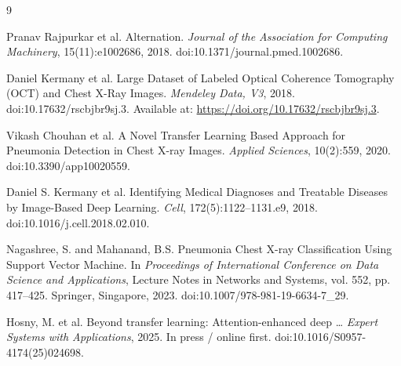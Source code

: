 \documentclass[11pt]{article}
\begin{document}
\pagebreak
\begin{thebibliography}{9}  %

Pranav Rajpurkar et al.
\newblock Alternation.
\newblock \emph{Journal of the Association for Computing Machinery}, 15(11):e1002686, 2018.
\newblock doi:10.1371/journal.pmed.1002686.

Daniel Kermany et al.
\newblock Large Dataset of Labeled Optical Coherence Tomography (OCT) and Chest X-Ray Images.
\newblock \emph{Mendeley Data, V3}, 2018.
\newblock doi:10.17632/rscbjbr9sj.3.
\newblock Available at: \url{https://doi.org/10.17632/rscbjbr9sj.3}.

Vikash Chouhan et al.
\newblock A Novel Transfer Learning Based Approach for Pneumonia Detection in Chest X-ray Images.
\newblock \emph{Applied Sciences}, 10(2):559, 2020.
\newblock doi:10.3390/app10020559.

Daniel S. Kermany et al.
\newblock Identifying Medical Diagnoses and Treatable Diseases by Image-Based Deep Learning.
\newblock \emph{Cell}, 172(5):1122--1131.e9, 2018.
\newblock doi:10.1016/j.cell.2018.02.010.

Nagashree, S. and Mahanand, B.S.
\newblock Pneumonia Chest X-ray Classification Using Support Vector Machine.
\newblock In \emph{Proceedings of International Conference on Data Science and Applications},
Lecture Notes in Networks and Systems, vol. 552, pp. 417--425. Springer, Singapore, 2023.
\newblock doi:10.1007/978-981-19-6634-7\_29.

Hosny, M. et al.
\newblock Beyond transfer learning: Attention-enhanced deep … 
\newblock \emph{Expert Systems with Applications}, 2025. In press / online first.
\newblock doi:10.1016/S0957-4174(25)024698.

\end{thebibliography}
\end{document}
